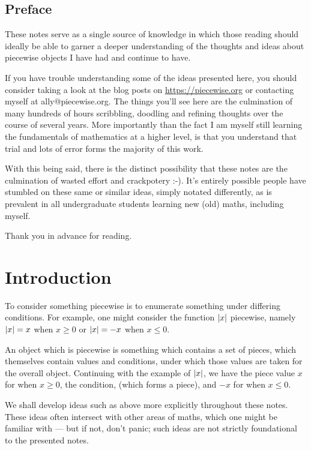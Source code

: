 \section*{Preface}
These notes serve as a single source of knowledge in which those reading should ideally be able to garner a deeper understanding of the thoughts and ideas about piecewise objects I have had and continue to have.

If you have trouble understanding some of the ideas presented here, you should consider taking a look at the blog posts on \url{https://piecewise.org} or contacting myself at ally@piecewise.org. The things you'll see here are the culmination of many hundreds of hours scribbling, doodling and refining thoughts over the course of several years. More importantly than the fact I am myself still learning the fundamentals of mathematics at a higher level, is that you understand that trial and lots of error forms the majority of this work.

With this being said, there is the distinct possibility that these notes are the culmination of wasted effort and crackpotery :-). It's entirely possible people have stumbled on these same or similar ideas, simply notated differently, as is prevalent in all undergraduate students learning new (old) maths, including myself.

Thank you in advance for reading.

\chapter{Introduction}
To consider something piecewise is to enumerate something under differing conditions. For example, one might consider the function $\abs{x}$ piecewise, namely $\abs{x}=x$ when $x\geq 0$ or $\abs{x}=-x$ when $x\leq 0$.

An object which is piecewise is something which contains a set of pieces, which themselves contain values and conditions, under which those values are taken for the overall object. Continuing with the example of $\abs{x}$, we have the piece value $x$ for when $x\geq 0$, the condition, (which forms a piece), and $-x$ for when $x\leq 0$.

We shall develop ideas such as above more explicitly throughout these notes. These ideas often intersect with other areas of maths, which one might be familiar with --- but if not, don't panic; such ideas are not strictly foundational to the presented notes.

